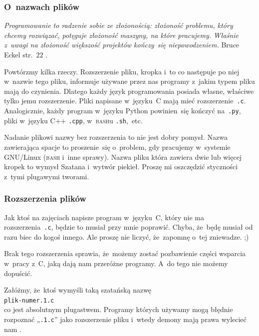 \documentclass[10pt,t]{beamer}
\begin{document}
\begin{frame}
  \frametitle{O~nazwach plików}


    \textit{Programowanie to radzenie sobie ze złożonością: złożoność
    problemu, który chcemy rozwiązać, potęguje złożoność maszyny, na które
    pracujemy. Właśnie z~uwagi na złożoność większość projektów kończy~się
    niepowodzeniem.} Bruce Eckel
  str.~$22$ \parencite{Eckel-Thinnking-in-Java-Ed-polska-Wyd-III-Pub-2003}.

  Powtórzmy kilka rzeczy. Rozszerzenie pliku, kropka i~to co następuje po
  niej w~nazwie tego pliku, informuje używane przez nas programy z~jakim
  typem pliku mają do czynienia. Dlatego każdy język programowania posiada
  własne, właściwe tylko jemu rozszerzenie. Pliki napisane w~języku~C mają
  mieć rozszerzenie~\texttt{.c}. Analogicznie, każdy program w~języku Python
  powinien~się kończyć na~\texttt{.py}, pliki w~języku C++ \texttt{.cpp},
  w~\textsc{bash}u \texttt{.sh},~etc.

  Nadanie plikowi nazwy bez rozszerzenia to nie jest dobry pomysł. Nazwa
  zawierająca spacje to proszenie~się o~problem, gdy pracujemy w~systemie
  GNU/Linux (\textsc{bash} i~inne sprawy). Nazwa pliku która zawiera
  dwie lub więcej kropek to wymysł Szatana i~wytwór piekieł. Proszę mi
  oszczędzić styczności z~tymi plugawymi tworami.

\end{frame}





\begin{frame}
  \frametitle{Rozszerzenia plików}


  Jak ktoś na zajęciach napisze program w~języku~C, który \alert{nie} ma
  rozszerzenia~\texttt{.c}, będzie to musiał przy mnie poprawić.
  Chyba, że~będę musiał od razu biec do kogoś innego. Ale proszę nie
  liczyć, że~zapomnę o~tej zniewadze. ;)

  Brak tego rozszerzenia sprawia, że~możemy zostać pozbawienie części
  wsparcia w~pracy z~C, jaką dają nam przeróżne programy. A~do tego
  \alert{nie} możemy dopuścić.

  Załóżmy, że~ktoś wymyśli taką szatańską nazwę \\
  \texttt{plik-numer.1.c} \\
  co jest absolutnym plugastwem. Programy których używamy mogą błędnie
  rozpoznać „\texttt{.1.c}” jako rozszerzenie pliku i~wtedy demony mają
  prawa wylecieć nam
  .


\end{frame}
\end{document}
